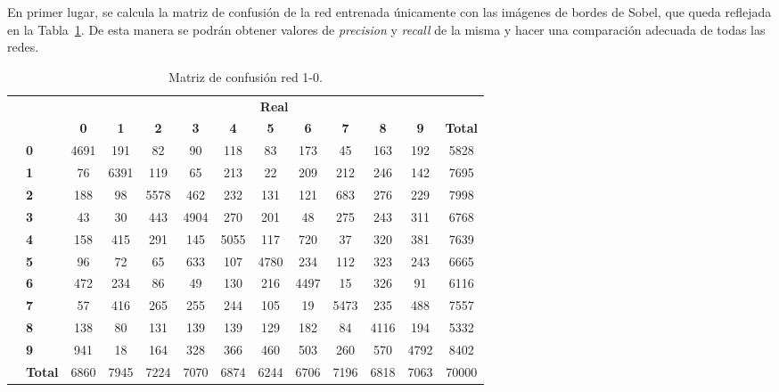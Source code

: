 En primer lugar, se calcula la matriz de confusión de la red entrenada únicamente con las imágenes de bordes de Sobel, que queda reflejada en la Tabla~\ref{tab.matriz1-0}. De esta manera se podrán obtener valores de \textit{precision} y \textit{recall} de la misma y hacer una comparación adecuada de todas las redes.\\
	\begin{table}[H]
		\centering
		\begin{tabular}{|c|l|c|c|c|c|c|c|c|c|c|c|c|}
			\cline{3-13} 
			 \multicolumn{2}{c|}{} & \multicolumn{11}{c|}{\textbf{Real}} \\ \cline{3-13} 
			 \multicolumn{2}{c|}{} & \textbf{0} & \textbf{1} & \textbf{2} &  \textbf{3} & \textbf{4} & \textbf{5} & \textbf{6} & \textbf{7} & \textbf{8} & \textbf{9} & \textbf{Total}\\ \hline
			 \multirow{10}{0.5cm}{\rotatebox{90}{\textbf{Predicción}}}& \textbf{0} &  \cellcolor{lightgray}4691 & 191 & 82 & 90 & 118 & 83 & 173 & 45 & 163 & 192 & 5828\\ \cline{2-13}
			 & \textbf{1} & 76 & \cellcolor{lightgray}6391 & 119 & 65 & 213 & 22 & 209 & 212 & 246 & 142 & 7695\\ \cline{2-13}
			 & \textbf{2} & 188 & 98 & \cellcolor{lightgray}5578 & 462 & 232 & 131 & 121 & 683 & 276 & 229 & 7998\\ \cline{2-13}
			 & \textbf{3} & 43 & 30 & 443 & \cellcolor{lightgray}4904 & 270 & 201 & 48 & 275 & 243 & 311 & 6768\\ \cline{2-13}
			 & \textbf{4} & 158 & 415 & 291 & 145 & \cellcolor{lightgray}5055 & 117 & 720 & 37 & 320 & 381 & 7639\\ \cline{2-13}
			 & \textbf{5} & 96 & 72 & 65 & 633 & 107 & \cellcolor{lightgray}4780 & 234 & 112 & 323 & 243 & 6665\\ \cline{2-13}
			 & \textbf{6} & 472 & 234 & 86 & 49 & 130 & 216 & \cellcolor{lightgray}4497 & 15 & 326 & 91 & 6116\\ \cline{2-13}
			 & \textbf{7} & 57 & 416 & 265 & 255 & 244 & 105 & 19 & \cellcolor{lightgray}5473 & 235 & 488 & 7557\\ \cline{2-13}
			 & \textbf{8} & 138 & 80 & 131 & 139 & 139 & 129 & 182 & 84 & \cellcolor{lightgray}4116 & 194 & 5332\\ \cline{2-13}
			 & \textbf{9} & 941 & 18 & 164 & 328 & 366 & 460 & 503 & 260 & 570 & \cellcolor{lightgray}4792 & 8402\\ \cline{2-13} 
			 & \textbf{Total} & 6860 & 7945 & 7224 & 7070 & 6874 & 6244 & 6706 & 7196 & 6818 & 7063 & 70000\\ \hline
		\end{tabular}
		\caption{Matriz de confusión red 1-0.}
		\label{tab.matriz1-0}
	\end{table}
	
